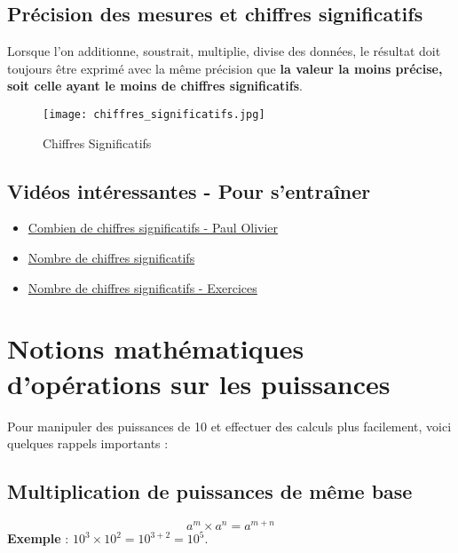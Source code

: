 \documentclass[a4paper,12pt]{article}
\begin{document}
\subsection{Précision des mesures et chiffres significatifs}

\begin{tcolorbox}[colback=red!10!white, colframe=red!75!black, title=PAR COEUR]
  Lorsque l’on additionne, soustrait, multiplie, divise des données, le résultat doit toujours être exprimé avec la même précision que \textbf{la valeur la moins précise, soit celle ayant le moins de chiffres significatifs}.
\end{tcolorbox}

\begin{figure}[H]
  \centering
  \texttt{[image: chiffres\_significatifs.jpg]}
  \caption{\label{} Chiffres Significatifs}
\end{figure}


\subsection{Vidéos intéressantes - Pour s'entraîner}

\begin{itemize}[noitemsep]
  \item \href{https://www.youtube.com/watch?v=1zAPfrZaAiA&ab_channel=PaulOlivier}{Combien de chiffres significatifs - Paul Olivier}
  \item \href{https://www.youtube.com/watch?v=aJKvYiGXqoM&ab_channel=FlorenceRAFFINlaphysiquechimieaulyc%C3%A9e}{Nombre de chiffres significatifs}
  \item \href{https://youtube.com/shorts/7wfK1r2kft4?si=ufaaWyjVTLT19Iv4}{Nombre de chiffres significatifs - Exercices}
\end{itemize}


\section{Notions mathématiques d'opérations sur les puissances}

Pour manipuler des puissances de 10 et effectuer des calculs plus facilement, voici quelques rappels importants :

\subsection{Multiplication de puissances de même base}
\[
a^m \times a^n = a^{m + n}
\]
\textbf{Exemple} : \( 10^3 \times 10^2 = 10^{3+2} = 10^5 \).
\end{document}
